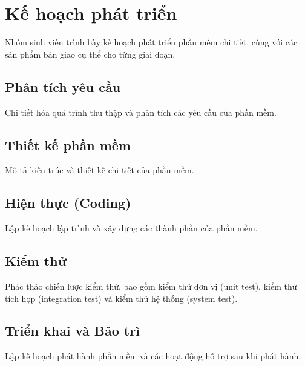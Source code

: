 \section{Kế hoạch phát triển}

Nhóm sinh viên trình bày kế hoạch phát triển phần mềm chi tiết, cùng với các sản phẩm bàn giao cụ thể cho từng giai đoạn.

\subsection{Phân tích yêu cầu}
Chi tiết hóa quá trình thu thập và phân tích các yêu cầu của phần mềm.

\subsection{Thiết kế phần mềm}
Mô tả kiến trúc và thiết kế chi tiết của phần mềm.

\subsection{Hiện thực (Coding)}
Lập kế hoạch lập trình và xây dựng các thành phần của phần mềm.

\subsection{Kiểm thử}
Phác thảo chiến lược kiểm thử, bao gồm kiểm thử đơn vị (unit test), kiểm thử tích hợp (integration test) và kiểm thử hệ thống (system test).

\subsection{Triển khai và Bảo trì}
Lập kế hoạch phát hành phần mềm và các hoạt động hỗ trợ sau khi phát hành.
